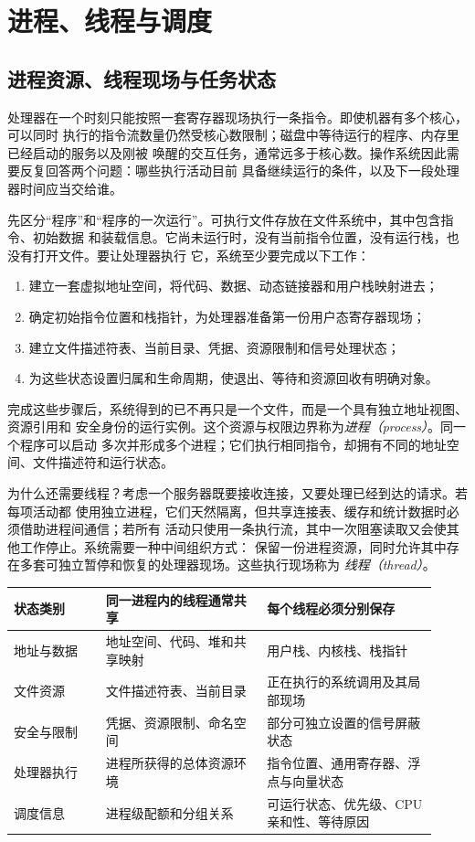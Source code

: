 \chapter{进程、线程与调度}

\section{进程资源、线程现场与任务状态}

处理器在一个时刻只能按照一套寄存器现场执行一条指令。即使机器有多个核心，可以同时
执行的指令流数量仍然受核心数限制；磁盘中等待运行的程序、内存里已经启动的服务以及刚被
唤醒的交互任务，通常远多于核心数。操作系统因此需要反复回答两个问题：哪些执行活动目前
具备继续运行的条件，以及下一段处理器时间应当交给谁。

先区分“程序”和“程序的一次运行”。可执行文件存放在文件系统中，其中包含指令、初始数据
和装载信息。它尚未运行时，没有当前指令位置，没有运行栈，也没有打开文件。要让处理器执行
它，系统至少要完成以下工作：

\begin{enumerate}
\tightlist
\item 建立一套虚拟地址空间，将代码、数据、动态链接器和用户栈映射进去；
\item 确定初始指令位置和栈指针，为处理器准备第一份用户态寄存器现场；
\item 建立文件描述符表、当前目录、凭据、资源限制和信号处理状态；
\item 为这些状态设置归属和生命周期，使退出、等待和资源回收有明确对象。
\end{enumerate}

完成这些步骤后，系统得到的已不再只是一个文件，而是一个具有独立地址视图、资源引用和
安全身份的运行实例。这个资源与权限边界称为\emph{进程（process）}。同一个程序可以启动
多次并形成多个进程；它们执行相同指令，却拥有不同的地址空间、文件描述符和运行状态。

为什么还需要线程？考虑一个服务器既要接收连接，又要处理已经到达的请求。若每项活动都
使用独立进程，它们天然隔离，但共享连接表、缓存和统计数据时必须借助进程间通信；若所有
活动只使用一条执行流，其中一次阻塞读取又会使其他工作停止。系统需要一种中间组织方式：
保留一份进程资源，同时允许其中存在多套可独立暂停和恢复的处理器现场。这些执行现场称为
\emph{线程（thread）}。

\begin{longtable}{|L{0.2\linewidth}|L{0.35\linewidth}|L{0.37\linewidth}|}
\toprule
状态类别 & 同一进程内的线程通常共享 & 每个线程必须分别保存 \\
\midrule
地址与数据 & 地址空间、代码、堆和共享映射 & 用户栈、内核栈、栈指针 \\\tablerowrule
文件资源 & 文件描述符表、当前目录 & 正在执行的系统调用及其局部现场 \\\tablerowrule
安全与限制 & 凭据、资源限制、命名空间 & 部分可独立设置的信号屏蔽状态 \\\tablerowrule
处理器执行 & 进程所获得的总体资源环境 & 指令位置、通用寄存器、浮点与向量状态 \\\tablerowrule
调度信息 & 进程级配额和分组关系 & 可运行状态、优先级、CPU 亲和性、等待原因 \\
\bottomrule
\end{longtable}

